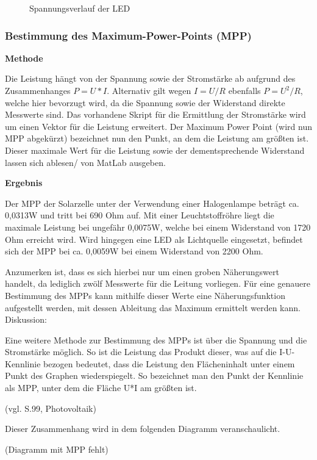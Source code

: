 \documentclass{etit-workshop-protokoll}
\begin{document}
        \begin{figure}[H]
            \def\svgwidth{\textwidth}
            
            
            \caption{Spannungsverlauf der LED}
        \end{figure}

    \subsubsection{Bestimmung des Maximum-Power-Points (MPP)}           %
        \textbf{Methode}
        \newline
        \par Die Leistung hängt von der Spannung sowie der Stromstärke ab aufgrund des Zusammenhanges $P=U*I$. Alternativ gilt wegen $I=U/R$ ebenfalls $P=U^2/R$, welche hier bevorzugt wird, da die Spannung sowie der Widerstand direkte Messwerte sind. Das vorhandene Skript für die Ermittlung der Stromstärke wird um einen Vektor für die Leistung erweitert.
        Der Maximum Power Point (wird nun MPP abgekürzt) bezeichnet nun den Punkt, an dem die Leistung am größten ist. Dieser maximale Wert für die Leistung sowie der dementsprechende Widerstand lassen sich ablesen/ von MatLab ausgeben. 
        
        \vspace{4mm}
        \textbf{Ergebnis}
        \par Der MPP der Solarzelle unter der Verwendung einer Halogenlampe beträgt ca. 0,0313W und tritt bei 690 Ohm auf. Mit einer Leuchtstoffröhre liegt die maximale Leistung bei ungefähr 0,0075W, welche bei einem Widerstand von 1720 Ohm erreicht wird. Wird hingegen eine LED als Lichtquelle eingesetzt, befindet sich der MPP bei ca. 0,0059W bei einem Widerstand von 2200 Ohm.
        \par Anzumerken ist, dass es sich hierbei nur um einen groben Näherungswert handelt, da lediglich zwölf Messwerte für die Leitung vorliegen. Für eine genauere Bestimmung des MPPs kann mithilfe dieser Werte eine Näherungsfunktion aufgestellt werden, mit dessen Ableitung das Maximum ermittelt werden kann. 
        Diskussion:
        \par Eine weitere Methode zur Bestimmung des MPPs ist über die Spannung und die Stromstärke möglich. So ist die Leistung das Produkt dieser, was auf die I-U-Kennlinie bezogen bedeutet, dass die Leistung den Flächeninhalt unter einem Punkt des Graphen wiederspiegelt. So bezeichnet man den Punkt der Kennlinie als MPP, unter dem die Fläche U*I am größten ist. \par (vgl. S.99, Photovoltaik)
        \par Dieser Zusammenhang wird in dem folgenden Diagramm veranschaulicht.
        \par (Diagramm mit MPP fehlt)
\end{document}
